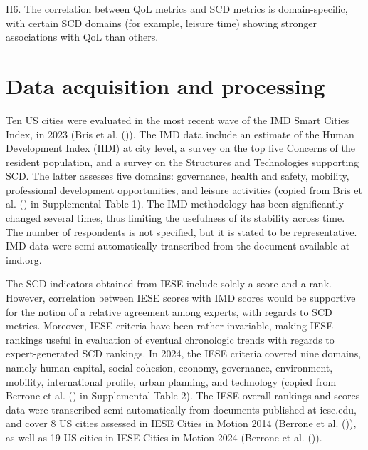\documentclass[
  english,
  12pt,
  a4paper,
]{scrartcl}
\begin{document}
H6. The correlation between QoL metrics and SCD metrics is
domain-specific, with certain SCD domains (for example, leisure time)
showing stronger associations with QoL than others.

\section{Data acquisition and
processing}\label{data-acquisition-and-processing}

Ten US cities were evaluated in the most recent wave of the IMD Smart
Cities Index, in 2023 (Bris et al.
()). The IMD data include an
estimate of the Human Development Index (HDI) at city level, a survey on
the top five Concerns of the resident population, and a survey on the
Structures and Technologies supporting SCD. The latter assesses five
domains: governance, health and safety, mobility, professional
development opportunities, and leisure activities (copied from Bris et
al. () in Supplemental Table
1). The IMD methodology has been significantly changed several times,
thus limiting the usefulness of its stability across time. The number of
respondents is not specified, but it is stated to be representative. IMD
data were semi-automatically transcribed from the document available at
imd.org.

The SCD indicators obtained from IESE include solely a score and a rank.
However, correlation between IESE scores with IMD scores would be
supportive for the notion of a relative agreement among experts, with
regards to SCD metrics. Moreover, IESE criteria have been rather
invariable, making IESE rankings useful in evaluation of eventual
chronologic trends with regards to expert-generated SCD rankings. In
2024, the IESE criteria covered nine domains, namely human capital,
social cohesion, economy, governance, environment, mobility,
international profile, urban planning, and technology (copied from
Berrone et al. () in
Supplemental Table 2). The IESE overall rankings and scores data were
transcribed semi-automatically from documents published at iese.edu, and
cover 8 US cities assessed in IESE Cities in Motion 2014 (Berrone et al.
()), as well as 19 US
cities in IESE Cities in Motion 2024 (Berrone et al.
()).
\end{document}
